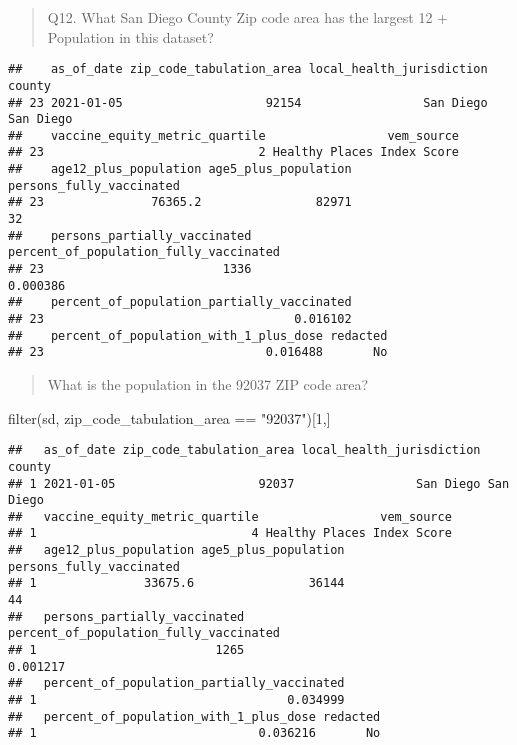 \documentclass[
]{article}
\newenvironment{Shaded}{\begin{snugshade}}{\end{snugshade}}
\newcommand{\DecValTok}[1]{\textcolor[rgb]{0.00,0.00,0.81}{#1}}
\newcommand{\FunctionTok}[1]{\textcolor[rgb]{0.00,0.00,0.00}{#1}}
\newcommand{\NormalTok}[1]{#1}
\newcommand{\OtherTok}[1]{\textcolor[rgb]{0.56,0.35,0.01}{#1}}
\newcommand{\SpecialCharTok}[1]{\textcolor[rgb]{0.00,0.00,0.00}{#1}}
\newcommand{\StringTok}[1]{\textcolor[rgb]{0.31,0.60,0.02}{#1}}
\begin{document}
\begin{quote}
Q12. What San Diego County Zip code area has the largest 12 + Population
in this dataset?
\end{quote}

\begin{Shaded}
\end{Shaded}

\begin{verbatim}
##    as_of_date zip_code_tabulation_area local_health_jurisdiction    county
## 23 2021-01-05                    92154                 San Diego San Diego
##    vaccine_equity_metric_quartile                 vem_source
## 23                              2 Healthy Places Index Score
##    age12_plus_population age5_plus_population persons_fully_vaccinated
## 23               76365.2                82971                       32
##    persons_partially_vaccinated percent_of_population_fully_vaccinated
## 23                         1336                               0.000386
##    percent_of_population_partially_vaccinated
## 23                                   0.016102
##    percent_of_population_with_1_plus_dose redacted
## 23                               0.016488       No
\end{verbatim}

\begin{quote}
What is the population in the 92037 ZIP code area?
\end{quote}

\begin{Shaded}
\begin{Highlighting}[]
\FunctionTok{filter}\NormalTok{(sd, zip\_code\_tabulation\_area }\SpecialCharTok{==} \StringTok{"92037"}\NormalTok{)[}\DecValTok{1}\NormalTok{,]}
\end{Highlighting}
\end{Shaded}

\begin{verbatim}
##   as_of_date zip_code_tabulation_area local_health_jurisdiction    county
## 1 2021-01-05                    92037                 San Diego San Diego
##   vaccine_equity_metric_quartile                 vem_source
## 1                              4 Healthy Places Index Score
##   age12_plus_population age5_plus_population persons_fully_vaccinated
## 1               33675.6                36144                       44
##   persons_partially_vaccinated percent_of_population_fully_vaccinated
## 1                         1265                               0.001217
##   percent_of_population_partially_vaccinated
## 1                                   0.034999
##   percent_of_population_with_1_plus_dose redacted
## 1                               0.036216       No
\end{verbatim}
\end{document}
